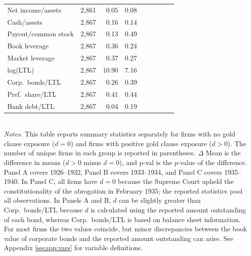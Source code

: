\begin{table}[p]
\begin{threeparttable}
\begin{tabular}{l rrr rrr rr}
            Net income/assets & 2,861 & 0.05 & 0.08 & & & & & \\
            Cash/assets & 2,867 & 0.16 & 0.14 & & & & & \\
            Payout/common stock & 2,867 & 0.13 & 0.49 & & & & & \\
            Book leverage & 2,867 & 0.36 & 0.24 & & & & & \\
            Market leverage & 2,867 & 0.37 & 0.27 & & & & & \\
            log(LTL) & 2,867 & 10.90 & 7.16 & & & & & \\
            Corp.\ bonds/LTL & 2,867 & 0.26 & 0.39 & & & & & \\
            Pref.\ share/LTL & 2,867 & 0.41 & 0.44 & & & & & \\
            Bank debt/LTL & 2,867 & 0.04 & 0.19 & & & & & \\
            \bottomrule
        \end{tabular}
    \end{threeparttable}\\
    
    \vspace*{3mm} \justifying \noindent
    \scriptsize{\textit{Notes.} This table reports summary statistics separately for firms with no gold clause exposure ($d = 0$) and firms with positive gold clause exposure ($d > 0$). The number of unique firms in each group is reported in parentheses. $\Delta$ Mean is the difference in means ($d > 0$ minus $d = 0$), and p-val is the $p$-value of the difference. Panel A covers 1926--1932, Panel B covers 1933--1934, and Panel C covers 1935--1940. In Panel C, all firms have $d = 0$ because the Supreme Court upheld the constitutionality of the abrogation in February 1935; the reported statistics pool all observations. In Panels A and B, $d$ can be slightly greater than Corp.\ bonds/LTL because $d$ is calculated using the reported amount outstanding of each bond, whereas Corp.\ bonds/LTL is based on balance sheet information. For most firms the two values coincide, but minor discrepancies between the book value of corporate bonds and the reported amount outstanding can arise. See Appendix \ref{secapp:vars} for variable definitions.}
\end{table}
